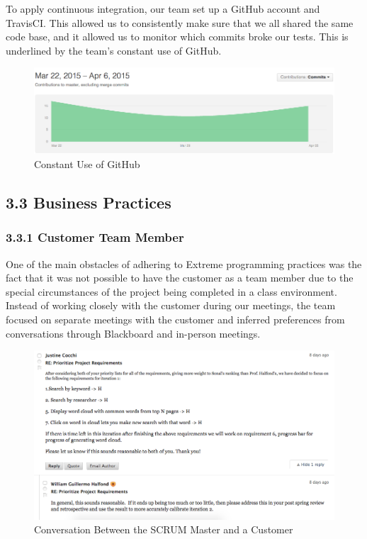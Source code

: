 \documentclass[]{article}
\begin{document}
To apply continuous integration, our team set up a GitHub account and
TravisCI. This allowed us to consistently make sure that we all shared
the same code base, and it allowed us to monitor which commits broke our
tests. This is underlined by the team's constant use of GitHub.


\begin{figure}[htbp]
\centering
\includegraphics{steady_pace.png}
\caption{Constant Use of GitHub}
\end{figure}

\subsection{3.3 Business Practices}\label{business-practices}

\subsubsection{3.3.1 Customer Team Member}\label{customer-team-member}

One of the main obstacles of adhering to Extreme programming practices
was the fact that it was not possible to have the customer as a team
member due to the special circumstances of the project being completed
in a class environment. Instead of working closely with the customer
during our meetings, the team focused on separate meetings with the
customer and inferred preferences from conversations through Blackboard
and in-person meetings.


\begin{figure}[htbp]
\centering
\includegraphics{sm_conv.png}
\caption{Conversation Between the SCRUM Master and a Customer}
\end{figure}
\end{document}
